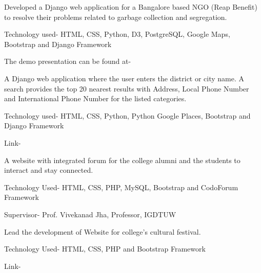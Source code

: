 \documentclass[]{resume-openfont}
\begin{document}
\begin{minipage}[t]{0.66\textwidth}
Developed a Django web application for a Bangalore based NGO (Reap Benefit) to resolve their problems related to garbage collection and segregation. \\
\begin{tightemize}
\item Technology used- HTML, CSS, Python, D3, PostgreSQL, Google Maps, Bootstrap and Django Framework
\item The demo presentation can be found at- \href{https:/youtu.be/UP_KwSg6GIk/}{}
\end{tightemize}
\sectionsep

A Django web application where the user enters the district or city name. A search provides the top 20 nearest results with Address, Local Phone Number and International Phone Number for the listed categories. 
\begin{tightemize}
\item Technology used- HTML, CSS, Python, Python Google Places, Bootstrap and Django Framework
\item Link- \href{https://find-my-perfect-place.herokuapp.com/}{}
\end{tightemize}
\sectionsep

A website with integrated forum for the college alumni and the students to interact and stay connected.
\begin{tightemize}
\item Technology Used- HTML, CSS, PHP, MySQL, Bootstrap and CodoForum Framework
\item Supervisor- Prof. Vivekanad Jha, Professor, IGDTUW
\end{tightemize}
\sectionsep

Lead the development of Website for college’s cultural festival. 
\begin{tightemize}
\item Technology Used- HTML, CSS, PHP and Bootstrap Framework
\item Link- \href{http://www.taarangana.com/}{}
\end{tightemize}


\end{minipage}
\end{document}
